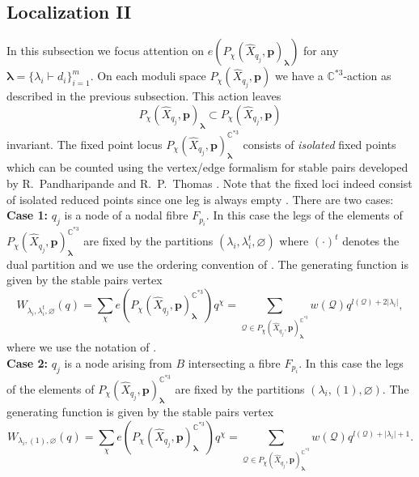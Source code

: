 \documentclass[12pt]{amsart}
\theoremstyle{definition}
\theoremstyle{property}
\newcommand\p{\mathbf{p}}
\newcommand\bslambda{\boldsymbol{\lambda}}
\newcommand\C{\mathbb C}
\newcommand\cQ{\mathcal Q}
\renewcommand\_{^{}_}
\begin{document}
\subsection{Localization II}

In this subsection we focus attention on $e(P_{\chi}(\widehat{X}_{q_j},\p)_{\bslambda})$ for any $\bslambda = \{\lambda_i \vdash d_i\}_{i=1}^{m}$. On each moduli space $P_{\chi}(\widehat{X}_{q_j},\p)$ we have a $\C^{*3}$-action as described in the previous subsection. This action leaves 
$$
P_{\chi}(\widehat{X}_{q_j},\p)_{\bslambda} \subset P_{\chi}(\widehat{X}_{q_j},\p)
$$
invariant. The fixed point locus $P_{\chi}(\widehat{X}_{q_j},\p)_{\bslambda}^{\C^{*3}}$ consists of \emph{isolated} fixed points which can be counted using the vertex/edge formalism for stable pairs developed by R.~Pandharipande and R.~P.~Thomas \cite{Pandharipande-Thomas2}. Note that the fixed loci indeed consist of isolated reduced points since one leg is always empty \cite{Pandharipande-Thomas2}. There are two cases: \\

\noindent \textbf{Case 1:} $q_j$ is a node of a nodal fibre $F_{p_i}$. In this case the legs of the elements of $P_{\chi}(\widehat{X}_{q_j},\p)_{\bslambda}^{\C^{*3}}$ are fixed by the partitions $(\lambda_i, \lambda_{i}^{t}, \varnothing)$ where $(\cdot)^{t}$ denotes the dual partition and we use the ordering convention of \cite{Ok-Re-Va}. The generating function is given by the stable pairs vertex
\begin{equation} \label{formalgenfun1}
W_{\lambda_i, \lambda_{i}^{t}, \varnothing}(q) = \sum_{\chi} e(P_{\chi}(\widehat{X}_{q_j},\p)_{\bslambda}^{\C^{*3}}) q^{\chi} =  \sum_{ \cQ \in P_{\chi}(\widehat{X}_{q_j},\p)_{\bslambda}^{\C^{*3}}} w(\cQ) q^{l(\cQ) + 2 |\lambda_i|},
\end{equation}
where we use the notation of \cite{Pandharipande-Thomas2}. \\

\noindent \textbf{Case 2:} $q_j$ is a node arising from $B$ intersecting a fibre $F_{p_i}$. In this case the legs of the elements of $P_{\chi}(\widehat{X}_{q_j},\p)_{\bslambda}^{\C^{*3}}$ are fixed by the partitions $(\lambda_i, (1), \varnothing)$. The generating function is given by the stable pairs vertex
\begin{equation} \label{formalgenfun2}
W_{\lambda_i, (1), \varnothing}(q) = \sum_{\chi} e(P_{\chi}(\widehat{X}_{q_j},\p)_{\bslambda}^{\C^{*3}}) q^{\chi} = \sum_{ \cQ \in P_{\chi}(\widehat{X}_{q_j},\p)_{\bslambda}^{\C^{*3}}} w(\cQ) q^{l(\cQ) + |\lambda_i| + 1}.
\end{equation}
\end{document}
